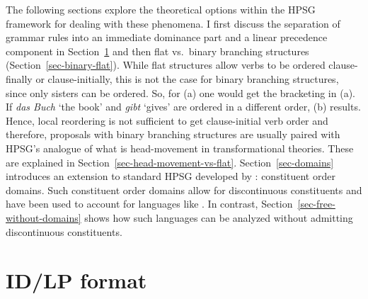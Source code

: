 \documentclass[output=paper
	        ,collection
	        ,collectionchapter
 	        ,biblatex
                ,babelshorthands
                ,newtxmath
                ,draftmode
                ,colorlinks, citecolor=brown
]{langscibook}
\begin{document}
The following sections explore the theoretical options within the HPSG framework for dealing with
these phenomena. I first discuss the separation of grammar rules into an immediate dominance part and
a linear precedence component in Section~\ref{sec-id-lp} and then flat vs.\ binary branching
structures (Section~\ref{sec-binary-flat}). While flat structures allow verbs to be ordered clause-finally
or clause-initially, this is not the case for binary branching structures, since only sisters can be
ordered. So, for (a) one would get the bracketing in (a). If \emph{das Buch} `the
book' and \emph{gibt} `gives' are ordered in a different order, (b) results.
\eal
{}
\zl
Hence, local reordering is not sufficient to get clause-initial verb order and therefore, proposals with binary branching
structures are usually paired with HPSG's analogue of what is head-movement in transformational
theories. These are explained in Section~\ref{sec-head-movement-vs-flat}. Section~\ref{sec-domains} introduces an extension to
standard HPSG developed by \citet{Reape94a}: constituent order domains. Such constituent
order domains allow for discontinuous constituents and have been used to account for languages like 
\citep{DS99a}. In contrast, Section~\ref{sec-free-without-domains} shows how such languages can be analyzed without admitting discontinuous constituents.


\section{ID/LP format}
\label{sec-id-lp}
\end{document}
